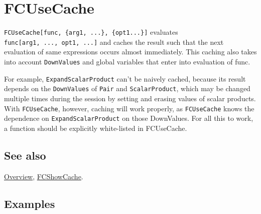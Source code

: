 \documentclass[../FeynCalcManual.tex]{subfiles}
\begin{document}
\hypertarget{fcusecache}{
\section{FCUseCache}\label{fcusecache}}

\texttt{FCUseCache[\allowbreak{}func,\ \allowbreak{}\{\allowbreak{}arg1,\ \allowbreak{}...\},\ \allowbreak{}\{\allowbreak{}opt1...\}]}
evaluates
\texttt{func[\allowbreak{}arg1,\ \allowbreak{}...,\ \allowbreak{}opt1,\ \allowbreak{}...]}
and caches the result such that the next evaluation of same expressions
occurs almost immediately. This caching also takes into account
\texttt{DownValues} and global variables that enter into evaluation of
func.

For example, \texttt{ExpandScalarProduct} can't be naively cached,
because its result depends on the \texttt{DownValues} of \texttt{Pair}
and \texttt{ScalarProduct}, which may be changed multiple times during
the session by setting and erasing values of scalar products. With
\texttt{FCUseCache}, however, caching will work properly, as
\texttt{FCUseCache} knows the dependence on \texttt{ExpandScalarProduct}
on those DownValues. For all this to work, a function should be
explicitly white-listed in FCUseCache.

\subsection{See also}

\hyperlink{toc}{Overview}, \hyperlink{fcshowcache}{FCShowCache}.

\subsection{Examples}
\end{document}
